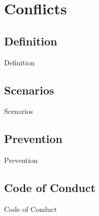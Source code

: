 %
%

\pagebreak
\section{Conflicts}

\onehalfspacing

\subsection{Definition}

Definition

\subsection{Scenarios}

Scenarios

\subsection{Prevention}

Prevention

\subsection{Code of Conduct}

Code of Conduct

